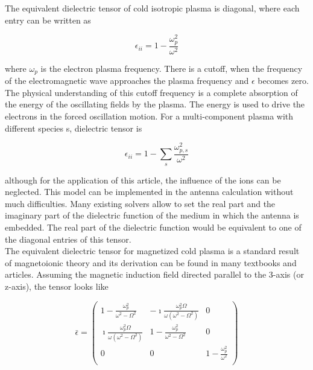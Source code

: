 \documentclass[a4paper,11pt]{article}
\begin{document}
The equivalent dielectric tensor of cold isotropic plasma is diagonal, where each entry can be written as



\begin{equation}\label{epsilon_plasma}
   \epsilon_{ii}=1-\frac{\omega_p^2 }{ \omega^2 }
\end{equation}

where $\omega_p$ is the electron plasma frequency. There is a cutoff, when the frequency of the electromagnetic wave approaches the plasma frequency and $\epsilon$ becomes zero. The physical understanding of this cutoff frequency is a complete absorption of the energy of the oscillating fields by the plasma. The energy is used to drive the electrons in the forced oscillation motion. For a multi-component plasma with different species s, dielectric tensor is

\begin{equation}
    \epsilon_{ii}=1-\sum_s \frac{\omega_{p,s}^2 }{ \omega^2 } 
\end{equation}

although for the application of this article, the influence of the ions can be neglected. This model can be implemented in the antenna calculation without much difficulties. Many existing solvers allow to set the real part and the imaginary part of the dielectric function of the medium in which the antenna is embedded. The real part of the dielectric function would be equivalent to one of the diagonal entries of this tensor.\\


The equivalent dielectric tensor for magnetized cold plasma is a standard result of magnetoionic theory and its derivation can be found in many textbooks and articles. Assuming the magnetic induction field directed parallel to the 3-axis (or z-axis), the tensor looks like

\begin{equation}
 \label{gyrotropic_tensor3_collless}
 \bar{\epsilon}=\left(%
 \begin{array}{ccc}
 1-\frac{\omega_p^2}{\omega^2 -\Omega^2} & -\imath \frac{\omega_p^2 \Omega}{\omega(\omega^2-\Omega^2)} & 0 \\
 \imath \frac{\omega_p^2 \Omega}{\omega(\omega^2-\Omega^2)} & 1-\frac{\omega_p^2}{\omega^2 -\Omega^2} & 0 \\
 0 & 0 & 1-\frac{\omega_p^2}{\omega^2} \\
 \end{array}
  \right)
  \end{equation}
\end{document}
